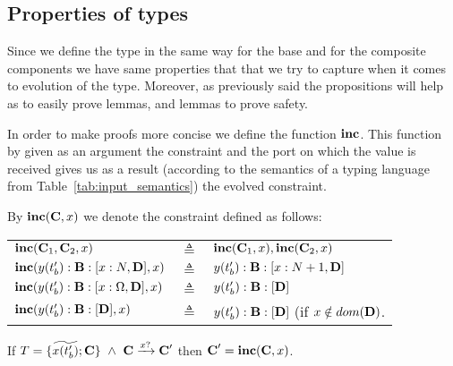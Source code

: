 \subsection{Properties of types}
 
 Since we define the type in the same way for the base and for the composite components we have same properties that that we try to capture when it comes to evolution of the type. Moreover, as previously said the propositions will help as to easily prove lemmas, and lemmas to prove safety.
 
 In order to make proofs more concise we define the function $\textbf{inc}$. This function by given as an argument the constraint and the port on which the value is received gives us as a result (according to the semantics of a typing language from Table~\ref{tab:input_semantics}) the evolved constraint.
 
 \begin{definition} By $\textbf{inc}(\textbf{C},x)$ we denote the constraint defined as follows:\\
 
 
 \begin{tabular}{l l l}
   $ \textbf{inc}(\textbf{C}_1,\textbf{C}_2,x)$ & $\triangleq$ & $\textbf{inc}(\textbf{C}_1,x),\textbf{inc}(\textbf{C}_2,x)$\\
   
    $\textbf{inc}(y(t_b'):\textbf{B}:[x:N,\textbf{D}],x)$ & $\triangleq$ & $y(t_b'):\textbf{B}:[x:N+1,\textbf{D}]$\\
    
    $\textbf{inc}(y(t_b'):\textbf{B}:[x:\Omega,\textbf{D}],x)$ &  $\triangleq$ & $y(t_b'):\textbf{B}:[\textbf{D}]$\\
    
    $\textbf{inc} (y(t_b'):\textbf{B}:[\textbf{D}],x)$ & $\triangleq$ & $y(t_b'):\textbf{B}:[\textbf{D}]$ (if $x\notin dom(\textbf{D})$. 
    
\end{tabular}
 
 
 
 \end{definition}
 
 
 
 
\begin{proposition}  If $T=\{\widetilde{\depen{x}{t_b'}}; \C\} \ \wedge \   \C\inputx\C'$ then $\textbf{C}'=\textbf{inc} (\textbf{C},x)$.


\end{proposition}
 
